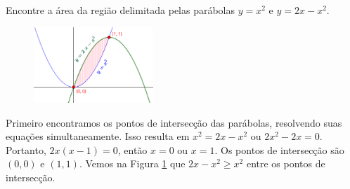 \cleardoublepage\documentclass[../main.tex]{subfiles}
\begin{document}
\begin{ex}
Encontre a área da região delimitada pelas parábolas $y =x^2$ e $y = 2 x - x^2$.
\end{ex}
\solution
\begin{figure}
\includegraphics[width=0.4\textwidth]{figs/AreaEntcurvas/AreaCurvasEx3.png}
\caption{}\label{fig:eAreaCurvasx3}
\end{figure}
 Primeiro encontramos os pontos de intersecção das parábolas, resolvendo suas equações simultaneamente. Isso resulta em $ x^2=  2 x- x^2$ ou $2x^2 - 2 x=  0$. Portanto, $2 x ( x - 1)=  0$, então $x=0$ ou $x=1$. Os pontos de intersecção são $(0, 0)$ e $(1, 1)$.  Vemos na Figura \ref{fig:eAreaCurvasx3} que $2x-x^2\geq x^2$ entre os pontos de intersecção.
 
\end{document}

